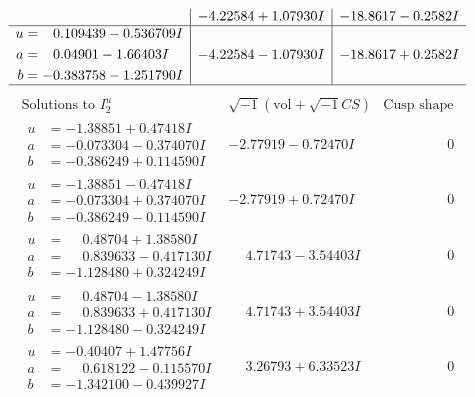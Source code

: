 \documentclass[1p]{elsarticle_modified}
\theoremstyle{definition}
\newcommand{\I}{\sqrt{-1}}
\begin{document}
$$\begin{array}{c|c|c}
 & -4.22584 + 1.07930 I & -18.8617 - 0.2582 I \\ \hline\begin{aligned}
u &= \phantom{-}0.109439 - 0.536709 I \\
a &= \phantom{-}0.04901 - 1.66403 I \\
b &= -0.383758 - 1.251790 I\end{aligned}
 & -4.22584 - 1.07930 I & -18.8617 + 0.2582 I\\
 \hline 
 \end{array}$$\newpage$$\begin{array}{c|c|c}  
\text{Solutions to }I^u_{2}& \I (\text{vol} + \sqrt{-1}CS) & \text{Cusp shape}\\
 \hline 
\begin{aligned}
u &= -1.38851 + 0.47418 I \\
a &= -0.073304 - 0.374070 I \\
b &= -0.386249 + 0.114590 I\end{aligned}
 & -2.77919 - 0.72470 I & \phantom{-0.000000 } 0 \\ \hline\begin{aligned}
u &= -1.38851 - 0.47418 I \\
a &= -0.073304 + 0.374070 I \\
b &= -0.386249 - 0.114590 I\end{aligned}
 & -2.77919 + 0.72470 I & \phantom{-0.000000 } 0 \\ \hline\begin{aligned}
u &= \phantom{-}0.48704 + 1.38580 I \\
a &= \phantom{-}0.839633 - 0.417130 I \\
b &= -1.128480 + 0.324249 I\end{aligned}
 & \phantom{-}4.71743 - 3.54403 I & \phantom{-0.000000 } 0 \\ \hline\begin{aligned}
u &= \phantom{-}0.48704 - 1.38580 I \\
a &= \phantom{-}0.839633 + 0.417130 I \\
b &= -1.128480 - 0.324249 I\end{aligned}
 & \phantom{-}4.71743 + 3.54403 I & \phantom{-0.000000 } 0 \\ \hline\begin{aligned}
u &= -0.40407 + 1.47756 I \\
a &= \phantom{-}0.618122 - 0.115570 I \\
b &= -1.342100 - 0.439927 I\end{aligned}
 & \phantom{-}3.26793 + 6.33523 I & \phantom{-0.000000 } 0 \\ \hline\begin{aligned}

\end{aligned}
\end{array}$$
\end{document}
